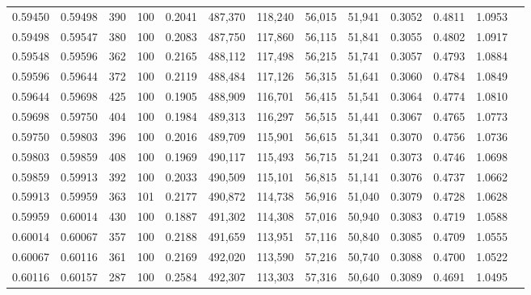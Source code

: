 \begin{tabular}{rrrrrrrrrrrrr}
0.59450 & 0.59498 &   390 & 100 &                                     0.2041 & 487,370 & 118,240 &  56,015 &  51,941 & 0.3052 & 0.4811 & 1.0953 \\
0.59498 & 0.59547 &   380 & 100 &                                     0.2083 & 487,750 & 117,860 &  56,115 &  51,841 & 0.3055 & 0.4802 & 1.0917 \\
0.59548 & 0.59596 &   362 & 100 &                                     0.2165 & 488,112 & 117,498 &  56,215 &  51,741 & 0.3057 & 0.4793 & 1.0884 \\
0.59596 & 0.59644 &   372 & 100 &                                     0.2119 & 488,484 & 117,126 &  56,315 &  51,641 & 0.3060 & 0.4784 & 1.0849 \\
0.59644 & 0.59698 &   425 & 100 &                                     0.1905 & 488,909 & 116,701 &  56,415 &  51,541 & 0.3064 & 0.4774 & 1.0810 \\
0.59698 & 0.59750 &   404 & 100 &                                     0.1984 & 489,313 & 116,297 &  56,515 &  51,441 & 0.3067 & 0.4765 & 1.0773 \\
0.59750 & 0.59803 &   396 & 100 &                                     0.2016 & 489,709 & 115,901 &  56,615 &  51,341 & 0.3070 & 0.4756 & 1.0736 \\
0.59803 & 0.59859 &   408 & 100 &                                     0.1969 & 490,117 & 115,493 &  56,715 &  51,241 & 0.3073 & 0.4746 & 1.0698 \\
0.59859 & 0.59913 &   392 & 100 &                                     0.2033 & 490,509 & 115,101 &  56,815 &  51,141 & 0.3076 & 0.4737 & 1.0662 \\
0.59913 & 0.59959 &   363 & 101 &                                     0.2177 & 490,872 & 114,738 &  56,916 &  51,040 & 0.3079 & 0.4728 & 1.0628 \\
0.59959 & 0.60014 &   430 & 100 &                                     0.1887 & 491,302 & 114,308 &  57,016 &  50,940 & 0.3083 & 0.4719 & 1.0588 \\
0.60014 & 0.60067 &   357 & 100 &                                     0.2188 & 491,659 & 113,951 &  57,116 &  50,840 & 0.3085 & 0.4709 & 1.0555 \\
0.60067 & 0.60116 &   361 & 100 &                                     0.2169 & 492,020 & 113,590 &  57,216 &  50,740 & 0.3088 & 0.4700 & 1.0522 \\
0.60116 & 0.60157 &   287 & 100 &                                     0.2584 & 492,307 & 113,303 &  57,316 &  50,640 & 0.3089 & 0.4691 & 1.0495 \\

\end{tabular}
